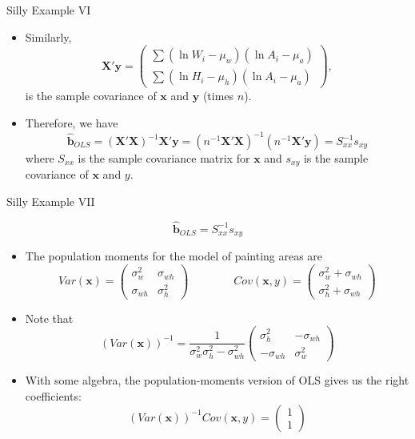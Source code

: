 \begin{frame}{Silly Example VI}

	\begin{itemize}
	\item Similarly,
\[
\boldsymbol{X'}\boldsymbol{y}=\left(\begin{array}{c}
\sum\left(\ln W_{i}-\mu_{w}\right)\left(\ln A_{i}-\mu_{a}\right)\\
\sum\left(\ln H_{i}-\mu_{h}\right)\left(\ln A_{i}-\mu_{a}\right)
\end{array}\right),
\]
is the sample covariance of $\boldsymbol{x}$ and $\boldsymbol{y}$
(times $n$). 

\smallskip
\item Therefore, we have
\[
\widehat{\boldsymbol{b}}_{OLS}=\left(\boldsymbol{X}'\boldsymbol{X}\right)^{-1}\boldsymbol{X}'\boldsymbol{y}=\left(n^{-1}\boldsymbol{X}'\boldsymbol{X}\right)^{-1}\left(n^{-1}\boldsymbol{X}'\boldsymbol{y}\right)=S_{xx}^{-1}s_{xy}
\]
where $S_{xx}$ is the sample covariance matrix for $\boldsymbol{x}$
and $s_{xy}$ is the sample covariance of $\boldsymbol{x}$ and $y$. 

\end{itemize}
\end{frame}


\begin{frame}{Silly Example VII}

\[
\widehat{\boldsymbol{b}}_{OLS}=S_{xx}^{-1}s_{xy}
\]

\begin{itemize}
	\item The population moments for the model of painting areas are \[
Var\left(\boldsymbol{x}\right)=\left(\begin{array}{cc}
\sigma_{w}^{2} & \sigma_{wh}\\
\sigma_{wh} & \sigma_{h}^{2}
\end{array}\right)\qquad\qquad Cov\left(\boldsymbol{x},y\right)=\left(\begin{array}{c}
\sigma_{w}^{2}+\sigma_{wh}\\
\sigma_{h}^{2}+\sigma_{wh}
\end{array}\right)
\]

\item Note that 
\[
\left(Var\left(\boldsymbol{x}\right)\right)^{-1}=\frac{1}{\sigma_{w}^{2}\sigma_{h}^{2}-\sigma_{wh}^{2}}\left(\begin{array}{cc}
\sigma_{h}^{2} & -\sigma_{wh}\\
-\sigma_{wh} & \sigma_{w}^{2}
\end{array}\right)
\]

\item With some algebra, the population-moments version of OLS gives us the right coefficients:
\[
\left(Var\left(\boldsymbol{x}\right)\right)^{-1}Cov\left(\boldsymbol{x},y\right)=\left(\begin{array}{c}
1\\
1
\end{array}\right)
\]
\end{itemize}
\end{frame}







